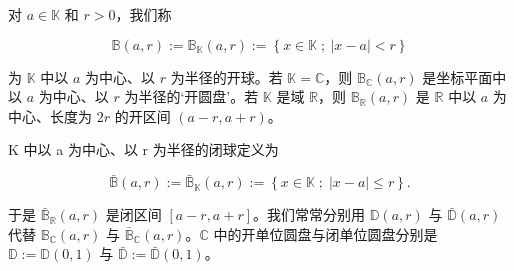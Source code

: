 对 $ a \in \mathbb{K} $ 和 $ r > 0 $，我们称

\[
\mathbb{B}(a,r):=\mathbb{B}_{\mathbb{K}}(a,r):=\left\{x\in\mathbb{K}\;;\ |x-a|<r\right\}
\]

为 $\mathbb{K}$ 中以 $ a $ 为中心、以 $ r $ 为半径的开球。若 $ \mathbb{K} = \mathbb{C} $，则 $ \mathbb{B}_{\mathbb{C}}(a, r) $ 是坐标平面中以 $ a $ 为中心、以 $ r $ 为半径的‘开圆盘’。若 $ \mathbb{K} $ 是域 $ \mathbb{R} $，则 $ \mathbb{B}_{\mathbb{R}}(a, r) $ 是 $\mathbb{R}$ 中以 $ a $ 为中心、长度为 $ 2r $ 的开区间 $ (a - r, a + r) $。


K 中以 a 为中心、以 r 为半径的闭球定义为

\[
\bar{\mathbb{B}}(a,r):=\bar{\mathbb{B}}_{\mathbb{K}}(a,r):=\left\{x\in\mathbb{K}\;;\;|x-a|\leq r\right\}.
\]

于是 $ \bar{\mathbb{B}}_{\mathbb{R}}(a,r) $ 是闭区间 $ [a-r,a+r] $。我们常常分别用 $ \mathbb{D}(a,r) $ 与 $ \bar{\mathbb{D}}(a,r) $ 代替 $ \mathbb{B}_{\mathbb{C}}(a,r) $ 与 $ \bar{\mathbb{B}}_{\mathbb{C}}(a,r) $。$\mathbb{C}$ 中的开单位圆盘与闭单位圆盘分别是 $ \mathbb{D}:=\mathbb{D}(0,1) $ 与 $ \bar{\mathbb{D}}:=\bar{\mathbb{D}}(0,1) $。

\exerciseshead

